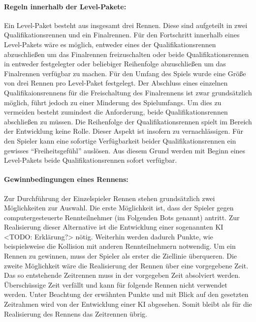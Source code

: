 		\paragraph{Regeln innerhalb der Level-Pakete:}
		Ein Level-Paket besteht aus insgesamt drei Rennen. Diese sind aufgeteilt in zwei Qualifikationsrennen und ein Finalrennen. Für den Fortschritt innerhalb eines Level-Pakets wäre es möglich, entweder eines der Qualifikationsrennen abzuschließen um das Finalrennen freizuschalten oder beide Qualifikationsrennen in entweder festgelegter oder beliebiger Reihenfolge abzuschließen um das Finalrennen verfügbar zu machen.
		Für den Umfang des Spiels wurde eine Größe von drei Rennen pro Level-Paket festgelegt. Der Abschluss eines einzelnen Qualifikaionsrennens für die Freischaltung des Finalrennens ist zwar grundsätzlich möglich, führt jedoch zu einer Minderung des Spielumfangs. Um dies zu vermeiden besteht zumindest die Anforderung, beide Qualifikationsrennen abschließen zu müssen. Die Reihenfolge der Qualifikationsrennen spielt im Bereich der Entwicklung keine Rolle. Dieser Aspekt ist insofern zu vernachlässigen. Für den Spieler kann eine sofortige Verfügbarkeit beider Qualifikationsrennen ein gewisses \enquote{Freiheitsgefühl} auslösen. Aus diesem Grund werden mit Beginn eines Level-Pakets beide Qualifikationsrennen sofort verfügbar.

		\paragraph{Gewinnbedingungen eines Rennens:}
		Zur Durchführung der Einzelspieler Rennen stehen grundsätzlich zwei Möglichkeiten zur Auswahl. Die erste Möglichkeit ist, dass der Spieler gegen computergesteuerte Rennteilnehmer (im Folgenden Bots genannt) antritt. Zur Realisierung dieser Alternative ist die Entwicklung einer sogenannten KI <TODO: Erklärung?> nötig. Weiterhin werden dadurch Punkte, wie beispielsweise die Kollision mit anderen Rennteilnehmern notwendig. Um ein Rennen zu gewinnen, muss der Spieler als erster die Ziellinie überqueren.
		Die zweite Möglichkeit wäre die Realisierung der Rennen über eine vorgegebene Zeit. Das so entstehende Zeitrennen muss in der vorgegeben Zeit absolviert werden. Überschüssige Zeit verfällt und kann für folgende Rennen nicht verwendet werden.
		Unter Beachtung der erwähnten Punkte und mit Blick auf den gesetzten Zeitrahmen wird von der Entwicklung einer KI abgesehen. Somit bleibt als für die Realisierung des Rennens das Zeitrennen übrig.

